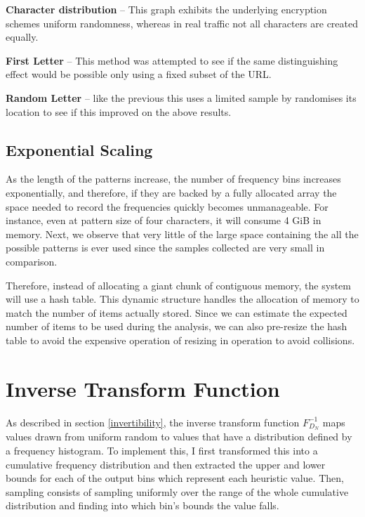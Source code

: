 \documentclass[ %
                    author={Samuel Russell},
                supervisor={Prof. Bogdan Warinschi},
                    degree={MEng},
                     title={Innocuous Ciphertexts},
                  subtitle={The DE-CENSOR Scheme},
                      type={Research},
                      year={2018} ]{dissertation}
\begin{document}
\textbf{Character distribution} -- This graph exhibits the underlying encryption schemes uniform randomness, whereas in real traffic not all characters are created equally.

\textbf{First Letter} -- This method was attempted to see if the same distinguishing effect would be possible only using a fixed subset of the URL.

\textbf{Random Letter} -- like the previous this uses a limited sample by randomises its location to see if this improved on the above results.

\subsection{Exponential Scaling}

As the length of the patterns increase, the number of frequency bins increases exponentially, and therefore, if they are backed by a fully allocated array the space needed to record the frequencies quickly becomes unmanageable.
For instance, even at pattern size of four characters, it will consume 4 GiB in memory.
Next, we observe that very little of the large space containing the all the possible patterns is ever used since the samples collected are very small in comparison.

Therefore, instead of allocating a giant chunk of contiguous memory, the system will use a hash table.
This dynamic structure handles the allocation of memory to match the number of items actually stored.
Since we can estimate the expected number of items to be used during the analysis, we can also pre-resize the hash table to avoid the expensive operation of resizing in operation to avoid collisions.

\section{Inverse Transform Function}

As described in section \ref{invertibility}, the inverse transform function $F^{-1}_{D_N}$ maps values drawn from uniform random to values that have a distribution defined by a frequency histogram.
To implement this, I first transformed this into a cumulative frequency distribution and then extracted the upper and lower bounds for each of the output bins which represent each heuristic value.
Then, sampling consists of sampling uniformly over the range of the whole cumulative distribution and finding into which bin's bounds the value falls.
\end{document}
